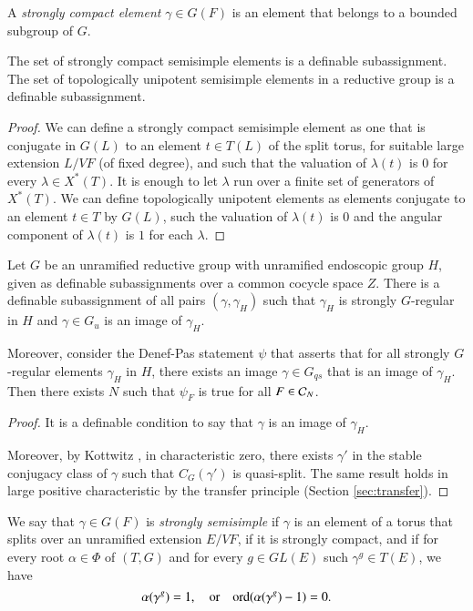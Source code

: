 A {\it strongly compact element} $\gamma\in G(F)$ is an element that
belongs to a bounded subgroup of $G$.

\begin{lemma} 
The set of strongly
  compact semisimple elements is a definable subassignment.
  The set of topologically unipotent semisimple elements in a
  reductive group is a definable subassignment.  
\end{lemma}

\begin{proof} We can define a strongly compact semisimple element as
  one that is conjugate in $G(L)$ to an element $t\in T(L)$ of the
  split torus, for suitable large extension $L/VF$
  (of fixed degree), and such that the valuation of $\lambda(t)$ is
  $0$ for every $\lambda\in X^*(T)$.  It is enough to let $\lambda$ run
  over a finite set of generators of $X^*(T)$.  We can define topologically
  unipotent elements as elements conjugate to an element $t\in T$ by
  $G(L)$, such the valuation of $\lambda(t)$ is $0$ and the angular
  component of $\lambda(t)$ is $1$ for each $\lambda$.
\end{proof}


\begin{lemma} 
  Let $G$ be an unramified reductive group with unramified endoscopic
  group $H$, given as definable subassignments over a common cocycle
  space $Z$.  There is a definable subassignment of all pairs
  $(\gamma,\gamma_H)$ such that $\gamma_H$ is strongly $G$-regular in $H$ and
  $\gamma\in G_u$ is an image of $\gamma_H$.  

  Moreover, consider the
  Denef-Pas statement $\psi$ that asserts that for all strongly
  $G$-regular elements $\gamma_H$ in $H$, there exists an image
  $\gamma\in G_{qs}$ that is an image of $\gamma_H$.  Then there
  exists $N$ such that $\psi_F$ is true for all $F\in\mathcal C_N$.
\end{lemma}

\begin{proof}  It is a definable condition to say that $\gamma$ is an
  image of $\gamma_H$.

  Moreover, by Kottwitz \cite[3.3]{kottwitz1982rational}, in
  characteristic zero, there exists $\gamma'$ in the stable conjugacy
  class of $\gamma$ such that $C_G(\gamma')$ is quasi-split.  The same result holds
  in large positive characteristic by the transfer principle (Section \ref{sec:transfer}).
\end{proof}

\begin{definition} 
  We say that $\gamma\in G(F)$ is {\it strongly semisimple} if $\gamma$
  is an element of a torus that splits over an unramified extension
  $E/VF$, if it is strongly compact, and if for every root $\alpha\in
  \Phi$ of $(T,G)$ and for every $g\in GL(E)$ such $\gamma^g\in T(E)$,
  we have
  \[
  \alpha(\gamma^g) = 1,\quad\text{or}\quad {\operatorname{ord}}(\alpha(\gamma^g)-1)=0.
  \]
 \end{definition}

